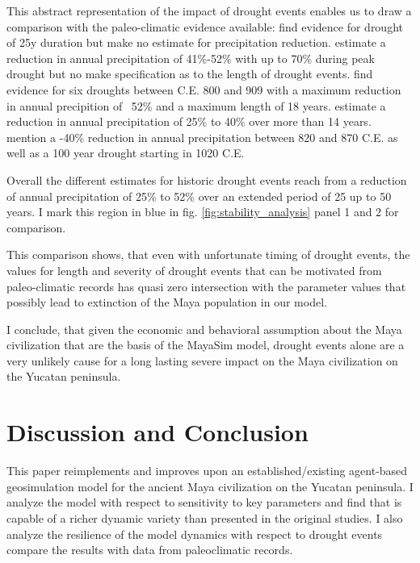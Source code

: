 This abstract representation of the impact of drought events enables us to draw a comparison with the paleo-climatic evidence available:
\cite{Stahle2011} find evidence for drought of 25y duration but make no estimate for precipitation reduction.
\cite{Evans2018} estimate a reduction in annual precipitation of 41\%-52\% with up to 70\% during peak drought but no make specification as to the length of drought events.
\cite{Medina-Elizalde2010} find evidence for six droughts between C.E. 800 and 909 with a maximum reduction in annual precipition of ~52\% and a maximum length of 18 years.
\cite{Medina-Elizalde2012} estimate a reduction in annual precipitation of 25\% to 40\% over more than 14 years.
\cite{Kennett2012} mention a -40\% reduction in annual precipitation between 820 and 870 C.E. as well as a 100 year drought starting in 1020 C.E.


Overall the different estimates for historic drought events reach from a reduction of annual precipitation of 25\% to 52\% over an extended period of 25 up to 50 years. I mark this region in blue in fig. \ref{fig:stability_analysis} panel 1 and 2 for comparison.

This comparison shows, that even with unfortunate timing of drought events, the values for length and severity of drought events that can be motivated from paleo-climatic records has quasi zero intersection with the parameter values that possibly lead to extinction of the Maya population in our model.

I conclude, that given the economic and behavioral assumption about the Maya civilization that are the basis of the MayaSim model, drought events alone are a very unlikely cause for a long lasting severe impact on the Maya civilization on the Yucatan peninsula.

\section{Discussion and Conclusion}

This paper reimplements and improves upon an established/existing agent-based geosimulation model for the ancient Maya civilization on the Yucatan peninsula.
I analyze the model with respect to sensitivity to key parameters and find that is capable of a richer dynamic variety than presented in the original studies.
I also analyze the resilience of the model dynamics with respect to drought events compare the results with data from paleoclimatic records.


